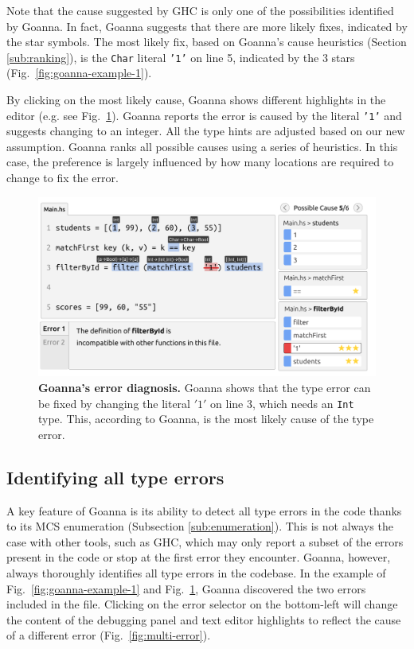     Note that the cause suggested by GHC is only one of the possibilities identified by Goanna. In fact, Goanna suggests that there are more likely fixes, indicated by the star symbols. The most likely fix, based on Goanna's cause heuristics (Section \ref{sub:ranking}), is the \texttt{Char} literal \texttt{'1'} on line 5, indicated by the 3 stars (Fig.~\ref{fig:goanna-example-1}).
    
    
    By clicking on the most likely cause, Goanna shows different highlights in the editor (e.g. see Fig.~\ref{fig:goanna-example-2}). Goanna reports the error is caused by the literal \texttt{'1'} and suggests changing to an integer. All the type hints are adjusted based on our new assumption. Goanna ranks all possible causes using a series of heuristics. In this case, the preference is largely influenced by how many locations are required to change to fix the error. 
    
    \begin{figure}[htb!]
        \centering
        \includegraphics[width=\linewidth]{images/goanna-example-2}
        \caption{\textbf{Goanna's error diagnosis.} Goanna shows that the type error can be fixed by changing the literal $'1'$ on line 3, which needs an \texttt{Int} type. This, according to Goanna, is the most likely cause of the type error.}
        \label{fig:goanna-example-2}
    \end{figure}


    \subsection{Identifying all type errors} \label{sub:all-errors}
    
    A key feature of Goanna is its ability to detect all type errors in the code thanks to its MCS enumeration (Subsection \ref{sub:enumeration}). This is not always the case with other tools, such as GHC, which may only report a subset of the errors present in the code or stop at the first error they encounter. Goanna, however, always thoroughly identifies all type errors in the codebase. In the example of Fig.~\ref{fig:goanna-example-1} and Fig.~\ref{fig:goanna-example-2}, Goanna discovered the two errors included in the file. Clicking on the error selector on the bottom-left will change the content of the debugging panel and text editor highlights to reflect the cause of a different error (Fig.~\ref{fig:multi-error}). 

